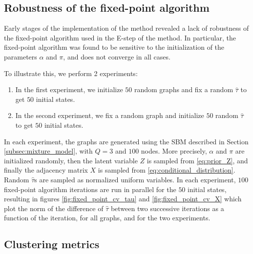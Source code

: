 \documentclass[switch, 12pt]{article}
\begin{document}
\begin{multicols}{2}
    \subsection{Robustness of the fixed-point algorithm}
    \label{subsec:robustness}

    Early stages of the implementation of the method revealed a lack of robustness of the fixed-point algorithm used in the E-step of the method. In particular, the fixed-point algorithm was found to be sensitive to the initialization of the parameters $\alpha$ and $\pi$, and does not converge in all cases.

    To illustrate this, we perform 2 experiments:
    \begin{enumerate}
        \item In the first experiment, we initialize $50$ random graphs and fix a random $\hat{\tau}$ to get $50$ initial states.
        \item In the second experiment, we fix a random graph and initialize $50$ random $\hat{\tau}$ to get $50$ initial states.
    \end{enumerate}
    In each experiment, the graphs are generated using the SBM described in Section \ref{subsec:mixture_model}, with $Q=3$ and $100$ nodes. More precisely, $\alpha$ and $\pi$ are initialized randomly, then the latent variable $Z$ is sampled from \eqref{eq:prior_Z}, and finally the adjacency matrix $X$ is sampled from \eqref{eq:conditional_distribution}. Random $\hat{\tau}$s are sampled as normalized uniform variables.
    In each experiment, $100$ fixed-point algorithm iterations are run in parallel for the $50$ initial states, resulting in figures \ref{fig:fixed_point_cv_tau} and \ref{fig:fixed_point_cv_X} which plot the norm of the difference of $\hat{\tau}$ between two successive iterations as a function of the iteration, for all graphs, and for the two experiments.


    \subsection{Clustering metrics}
    \label{subsec:metrics}


\end{multicols}
\end{document}
